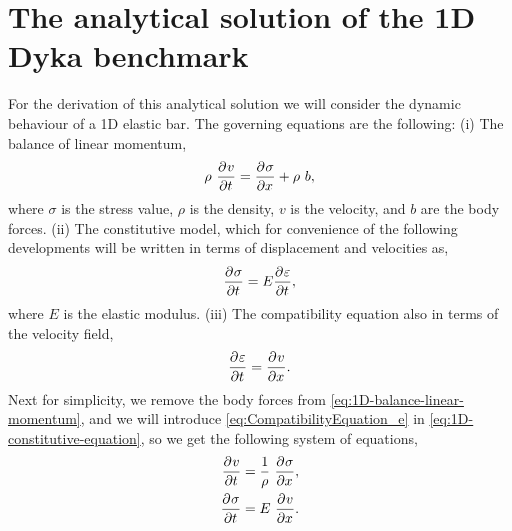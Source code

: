 \appendix
\section{The analytical solution of the 1D Dyka benchmark}
\label{app:analytical_sol}

For the derivation of this analytical solution we will consider  the
dynamic behaviour of a 1D elastic bar. The governing equations are the
following: (i) The balance of linear momentum,
\begin{equation}
  \label{eq:1D-balance-linear-momentum}
  \rho\ \frac{\partial^{}{v}}{ \partial {t}^{} } = \frac{\partial^{}{\sigma}}{ \partial {x}^{} } + \rho\ b,
\end{equation}
where $\sigma$ is the stress value, $\rho$ is the density,
$v$ is the velocity, and $b$ are the body
forces. (ii) The constitutive model, which for convenience of the
following developments will be written in terms of displacement and
velocities as, 
\begin{equation}
  \label{eq:1D-constitutive-equation}
  \frac{\partial^{}{\sigma}}{ \partial {t}^{} } = E \frac{\partial^{}{\varepsilon}}{ \partial {t}^{} },
\end{equation}
where $E$ is the elastic modulus. (iii) The compatibility equation
also in terms of the velocity field,
\begin{equation}
  \label{eq:CompatibilityEquation_e}
  \frac{\partial^{}{\varepsilon}}{ \partial {t}^{} } = \frac{\partial^{}{v}}{ \partial {x}^{} }.
\end{equation}
Next for simplicity, we remove the body forces from
\eqref{eq:1D-balance-linear-momentum}, and we will introduce
\eqref{eq:CompatibilityEquation_e} in
\eqref{eq:1D-constitutive-equation}, so we get the following system of equations,
\begin{align}
  \label{eq:1D-balance-linear-momentum-II}
  \frac{\partial^{}{v}}{ \partial {t}^{} } &= \frac{1}{\rho}\ \frac{\partial^{}{\sigma}}{ \partial {x}^{} }, \\
  \label{eq:1D-constitutive-equation-II}
  \frac{\partial^{}{\sigma}}{ \partial {t}^{} } &= E\ \frac{\partial^{}{v}}{ \partial {x}^{} }.
\end{align}

